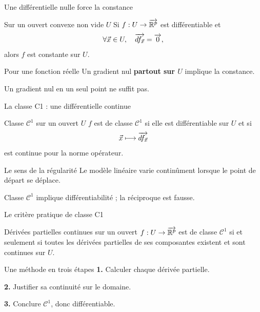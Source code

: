 \begin{frame}[t]{Une différentielle nulle force la constance}
\coursanalyse
\begin{theoreme}{Sur un ouvert convexe non vide $U$}
Si $f:U\to\overrightarrow{\mathbb R^{p}}$ est différentiable et
\[\forall\vec x\in U,\quad\overrightarrow{df_{\vec x}}=\overrightarrow{0},\]
alors $f$ est constante sur $U$.
\end{theoreme}
\begin{resultat}{Pour une fonction réelle}
Un gradient nul \textbf{partout sur $U$} implique la constance.
\end{resultat}
\vfill Un gradient nul en un seul point ne suffit pas.
\end{frame}

\begin{frame}[t]{La classe C1 : une différentielle continue}
\coursanalyse
\begin{notion}{Classe $\mathcal C^1$ sur un ouvert $U$}
$f$ est de classe $\mathcal C^1$ si elle est différentiable sur $U$ et si
\[\vec x\longmapsto\overrightarrow{df_{\vec x}}\]
est continue pour la norme opérateur.
\end{notion}
\begin{resultat}{Le sens de la régularité}
Le modèle linéaire varie continûment lorsque le point de départ se déplace.
\end{resultat}
\vfill Classe $\mathcal C^1$ implique différentiabilité ; la réciproque est fausse.
\end{frame}

\begin{frame}[t]{Le critère pratique de classe C1}
\coursanalyse
\begin{theoreme}{Dérivées partielles continues sur un ouvert}
$f:U\to\overrightarrow{\mathbb R^{p}}$ est de classe $\mathcal C^1$ si et seulement si toutes les dérivées partielles de ses composantes existent et sont continues sur $U$.
\end{theoreme}
\begin{cours}{Une méthode en trois étapes}
\textbf{1.} Calculer chaque dérivée partielle.

\medskip
\textbf{2.} Justifier sa continuité sur le domaine.

\medskip
\textbf{3.} Conclure $\mathcal C^1$, donc différentiable.
\end{cours}
\end{frame}

